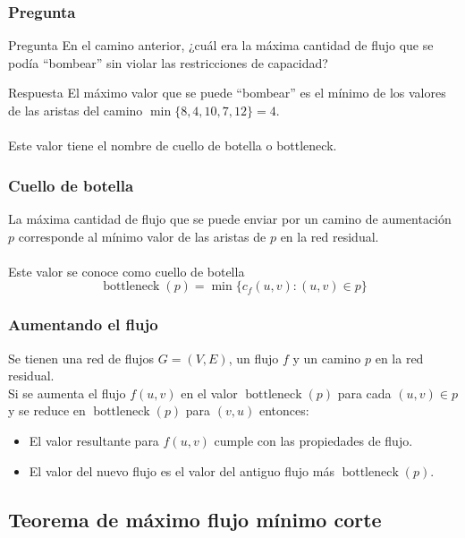 \documentclass{beamer}
\begin{document}
	
		\begin{frame}
			\frametitle{Pregunta}
			\begin{alertblock}{Pregunta}
				En el camino anterior, ¿cuál era la máxima cantidad de flujo que se podía ``bombear'' sin violar las restricciones de capacidad?
			\end{alertblock}
			\pause
			\begin{exampleblock}{Respuesta}
				El máximo valor que se puede ``bombear'' es el mínimo de los valores de las aristas del camino $\operatorname{min}\{8, 4, 10, 7, 12\} = 4$.\\ \quad \\
				Este valor tiene el nombre de cuello de botella o bottleneck.
			\end{exampleblock}
		\end{frame}
	
		\begin{frame}
			\frametitle{Cuello de botella}
			La máxima cantidad de flujo que se puede enviar por un camino de aumentación $p$ corresponde al mínimo valor de las aristas de $p$ en la red residual.\\ \quad \\
			Este valor se conoce como cuello de botella $$\operatorname{bottleneck}(p) = \operatorname{min}\{c_f(u,v) : (u,v) \in p\}$$
		\end{frame}
	
		\begin{frame}
			\frametitle{Aumentando el flujo}
			Se tienen una red de flujos $G = (V, E)$, un flujo $f$ y un camino $p$ en la red residual.\\
		
			Si se aumenta el flujo $f(u,v)$ en el valor $\operatorname{bottleneck}(p)$ para cada $(u,v) \in p$ y se reduce en $\operatorname{bottleneck}(p)$ para $(v,u)$ entonces:
			\begin{itemize}
				\item El valor resultante para $f(u,v)$ cumple con las propiedades de flujo.
				\item El valor del nuevo flujo es el valor del antiguo flujo más $\operatorname{bottleneck}(p)$.
			\end{itemize}
		\end{frame}

	\subsection{Teorema de máximo flujo mínimo corte}
	
\end{document}
